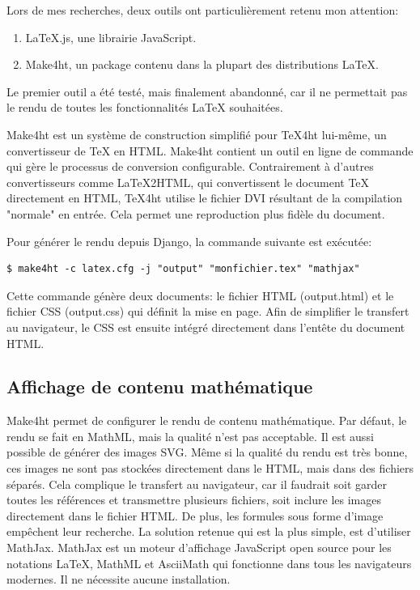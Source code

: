 \documentclass[12pt,titlepage,oneside]{article}
\renewcommand{\footnote}[1]{}
\begin{document}
Lors de mes recherches, deux outils ont particulièrement retenu mon attention:
\begin{enumerate}
\item LaTeX.js\footnote{\url{https://latex.js.org/}}, une librairie JavaScript.
\item Make4ht\footnote{\url{https://ctan.org/pkg/make4ht?lang=en}}, un package contenu dans la plupart des distributions LaTeX.
\end{enumerate}
Le premier outil a été testé, mais finalement abandonné\footnote{voir \nameref{AlternativesConsidérées}}, car il ne permettait pas le rendu de toutes les fonctionnalités LaTeX souhaitées.\par
Make4ht est un système de construction simplifié pour TeX4ht\footnote{voir \url{https://tug.org/tex4ht/}} lui-même, un convertisseur de TeX en HTML. Make4ht contient un outil en ligne de commande qui gère le processus de conversion configurable. Contrairement à d'autres convertisseurs comme LaTeX2HTML, qui convertissent le document TeX directement en HTML, TeX4ht utilise le fichier DVI\footnote{DeVice-Independent} résultant de la compilation "normale" en entrée. Cela permet une reproduction plus fidèle du document.\par

Pour générer le rendu depuis Django, la commande suivante est exécutée:
\begin{lstlisting}[style=MyHTML, caption = Ligne de commande pour le rendu]
$ make4ht -c latex.cfg -j "output" "monfichier.tex" "mathjax"
\end{lstlisting}
\vspace{-0.5cm}
Cette commande génère deux documents: le fichier HTML (output.html) et le fichier CSS (output.css) qui définit la mise en page. Afin de simplifier le transfert au navigateur, le CSS est ensuite intégré directement dans l'entête du document HTML.

\newpage

\subsection{Affichage de contenu mathématique}
Make4ht permet de configurer le rendu de contenu mathématique. Par défaut, le rendu se fait en MathML, mais la qualité n'est pas acceptable. Il est aussi possible de générer des images SVG. Même si la qualité du rendu est très bonne, ces images ne sont pas stockées directement dans le HTML, mais dans des fichiers séparés. Cela complique le transfert au navigateur, car il faudrait soit garder toutes les références et transmettre plusieurs fichiers, soit inclure les images directement dans le fichier HTML. De plus, les formules sous forme d'image empêchent leur recherche. La solution retenue qui est la plus simple, est d'utiliser MathJax\footnote{\url{https://docs.mathjax.org/en/latest/index.html}}. MathJax est un moteur d'affichage JavaScript open source pour les notations LaTeX, MathML et AsciiMath qui fonctionne dans tous les navigateurs modernes. Il ne nécessite aucune installation.
\end{document}
